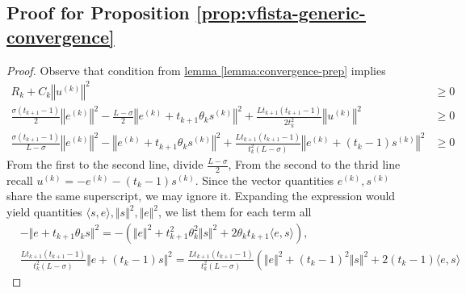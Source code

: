 \subsection{Proof for Proposition \ref*{prop:vfista-generic-convergence}}
    \begin{proof}\label{proof:vfista-generic-convergence}
        Observe that condition from \hyperref[lemma:convergence-prep]{lemma \ref*{lemma:convergence-prep}} implies 
        \begin{align*}
            R_k + C_k\left\Vert
            u^{(k)}
            \right\Vert^2 &\ge 0
            \\
            \frac{\sigma(t_{k + 1} - 1)}{2}
            \left\Vert e^{(k)}\right\Vert^2
            - 
            \frac{L - \sigma}{2}
            \left\Vert e^{(k)} + 
                t_{k + 1}\theta_k s^{(k)}
            \right\Vert^2 
            + 
            \frac{Lt_{k + 1}(t_{k + 1} - 1)}{2t_k^2} 
            \left\Vert u^{(k)}\right\Vert^2 &\ge 0
            \\
            \frac{\sigma(t_{k +1} - 1)}{L - \sigma}
            \left\Vert e^{(k)}\right\Vert^2
            - 
            \left\Vert e^{(k)} + 
                t_{k + 1}\theta_k s^{(k)}
            \right\Vert^2 
            + 
            \frac{Lt_{k + 1}(t_{k + 1} - 1)}{t^2_k(L - \sigma)}
            \left\Vert 
                e^{(k)} + (t_{k} - 1)s^{(k)}
            \right\Vert^2
            &\ge  0
        \end{align*}
        From the first to the second line, divide $\frac{L - \sigma}{2}$, From the second to the thrid line recall $u^{(k)} = -e^{(k)} - (t_{k} - 1)s^{(k)}$.
        Since the vector quantities $e^{(k)}, s^{(k)}$ share the same superscript, we may ignore it.
        Expanding the expression would yield quantities $\langle s, e\rangle, \Vert s\Vert^2, \Vert e\Vert^2$, we list them for each term all 
        \begin{align*}
            & 
            - \Vert e + t_{k + 1}\theta_k s\Vert^2
            = - \left(
                \Vert e\Vert^2 + t_{k + 1}^2\theta_k^2 \Vert s\Vert^2 + 
                2\theta_k t_{k + 1}\langle e, s\rangle
            \right), 
            \\
            & 
            \frac{Lt_{k + 1}(t_{k + 1} - 1)}{t_k^2(L - \sigma)} \Vert 
                e + (t_k - 1)s
            \Vert^2
            = 
            \frac{Lt_{k + 1}(t_{k + 1} - 1)}{t_k^2(L - \sigma)} 
            \left(
                \Vert e\Vert^2 + (t_k -1)^2 \Vert s\Vert^2 + 2(t_k - 1)\langle e, s\rangle

\end{align*}
\end{proof}
